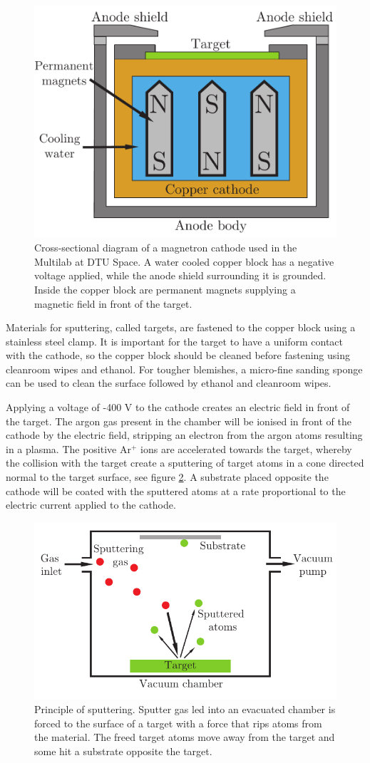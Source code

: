 \begin{figure}[htbp]
  \centering  \includegraphics[width=0.5\linewidth]{figures/chamber/cathodeintersection.pdf}
  \caption{\footnotesize Cross-sectional diagram of a magnetron cathode used in the Multilab at DTU Space. A water cooled copper block has a negative voltage applied, while the anode shield surrounding it is grounded. Inside the copper block are permanent magnets supplying a magnetic field in front of the target. }
  \label{fig:cathodeintersection}
\end{figure}

Materials for sputtering, called targets, are fastened to the copper block using a stainless steel clamp. It is important for the target to have a uniform contact with the cathode, so the copper block should be cleaned before fastening using cleanroom wipes and ethanol. For tougher blemishes, a micro-fine sanding sponge can be used to clean the surface followed by ethanol and cleanroom wipes.

Applying a voltage of -400 V to the cathode creates an electric field in front of the target. The argon gas present in the chamber will be ionised in front of the cathode by the electric field, stripping an electron from the argon atoms resulting in a plasma. The positive Ar$^+$ ions are accelerated towards the target, whereby the collision with the target create a sputtering of target atoms in a cone directed normal to the target surface, see figure \ref{fig:sputtering}. A substrate placed opposite the cathode will be coated with the sputtered atoms at a rate proportional to the electric current applied to the cathode.

\begin{figure}[htbp]
  \centering  \includegraphics[width=0.6\linewidth]{figures/chamber/sputtering.pdf}
  \caption{\footnotesize Principle of sputtering. Sputter gas led into an evacuated chamber is forced to the surface of a target with a force that rips atoms from the material. The freed target atoms move away from the target and some hit a substrate opposite the target. }
  \label{fig:sputtering}
\end{figure}

